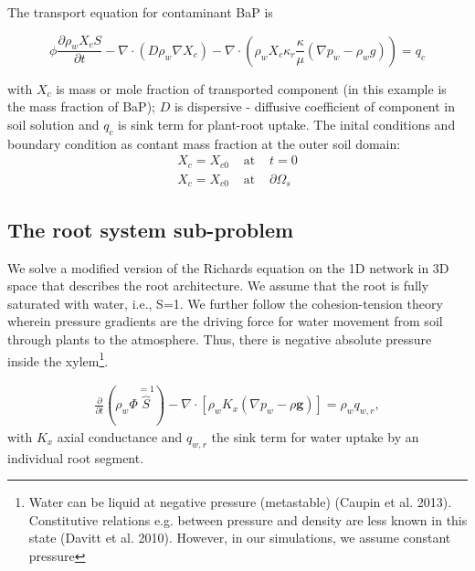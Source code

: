 The transport equation for contaminant BaP is

\[
\phi\frac{\partial\rho_{w}X_{c}S}{\partial t}-\nabla \cdot (D\rho_{w}\nabla X_{c})-\nabla \cdot (\rho_{w}X_{c}\kappa_{r}\frac{\kappa}{\mu}(\nabla p_{w}-\rho_{w}g))=q_{c}
\]

with $X_{c}$ is mass or mole fraction of transported component (in
this example is the mass fraction of BaP); $D$ is dispersive - diffusive
coefficient of component in soil solution and $q_{c}$ is sink term
for plant-root uptake. The inital conditions and boundary condition
as contant mass fraction at the outer soil domain:
\begin{eqnarray}
X_{c}=X_{c0} & \text{ at } & t=0\\
X_{c}=X_{c0} & \text{ at } & \partial\Omega_{s}
\end{eqnarray}


\subsection*{The root system sub-problem}

We solve a modified version of the Richards equation on the 1D network
in 3D space that describes the root architecture. We assume that the
root is fully saturated with water, i.e., S=1. We further follow the
cohesion-tension theory wherein pressure gradients are the driving
force for water movement from soil through plants to the atmosphere.
Thus, there is negative absolute pressure inside the xylem\footnote{Water can be liquid at negative pressure (metastable) (Caupin et al.
2013). Constitutive relations e.g. between pressure and density are
less known in this state (Davitt et al. 2010). However, in our simulations,
we assume constant pressure}.

\begin{eqnarray}
\frac{\partial}{\partial t}\left(\rho_{w}\Phi\overbrace{S}^{=1}\right)-\nabla\cdot\left[\rho_{w}K_{x}\left(\nabla p_{w}-\rho\boldsymbol{g}\right)\right]=\rho_{w}q_{w,r},
\end{eqnarray}
with $K_{x}$ axial conductance and $q_{w,r}$ the sink term for water
uptake by an individual root segment.

